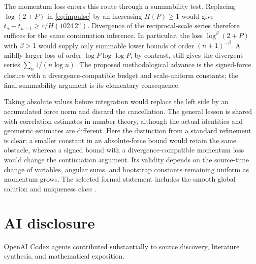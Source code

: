 \documentclass[11pt]{article}
\begin{document}
The momentum loss enters this route through a summability test. Replacing
$\log(2+P)$ in \eqref{eq:impulse} by an increasing $H(P)\ge1$ would give
$t_n-t_{n-1}\ge c/H(1024\,2^n)$. Divergence of the reciprocal-scale series
therefore suffices for the same continuation inference. In particular,
the loss $\log^\beta(2+P)$ with $\beta>1$ would supply only summable
lower bounds of order $(n+1)^{-\beta}$. A mildly larger loss of order
$\log P\log\log P$, by contrast, still gives the divergent series
$\sum_n1/(n\log n)$. The proposed methodological advance is the signed-force
closure with a divergence-compatible budget and scale-uniform constants;
the final summability argument is its elementary consequence.

Taking absolute values before integration would replace the left side by
an accumulated force norm and discard the cancellation. The general
lesson is shared with correlation estimates in number theory, although
the actual identities and geometric estimates are different. Here the distinction from a standard refinement is clear: a smaller
constant in an absolute-force bound would retain the same obstacle,
whereas a signed bound with a divergence-compatible momentum loss would
change the continuation argument. Its validity depends on the
source-time change of variables, angular sums, and bootstrap constants
remaining uniform as momentum grows. The selected formal statement
includes the smooth global solution and uniqueness class
\citep{OpenAIScope362}.



\section*{AI disclosure}
OpenAI Codex agents contributed substantially to source discovery,
literature synthesis, and mathematical exposition.
\begingroup\small


\endgroup
\end{document}
